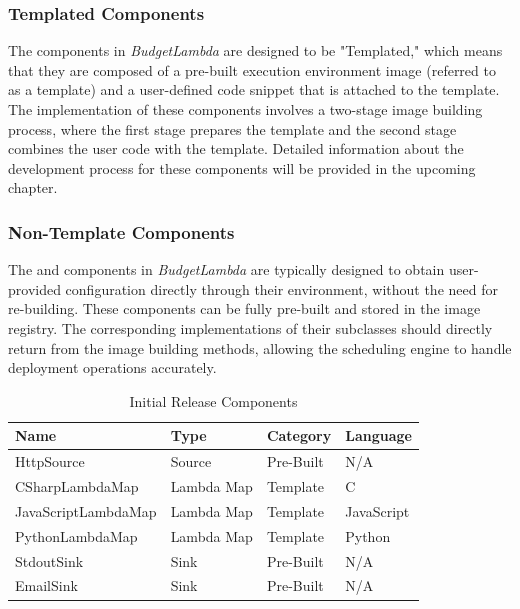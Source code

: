 \documentclass[fleqn,10pt]{SelfArx} %
\newcommand{\CSh}{C\nolinebreak\hspace{-.05em}\raisebox{.6ex}{\scriptsize\bf \#}}
\begin{document}
\subsubsection{Templated Components}

The  components in \emph{BudgetLambda} are designed to be "Templated," which means that they are composed of a pre-built execution environment image (referred to as a template) and a user-defined code snippet that is attached to the template. The implementation of these components involves a two-stage image building process, where the first stage prepares the template and the second stage combines the user code with the template. Detailed information about the development process for these components will be provided in the upcoming chapter.

\subsubsection{Non-Template Components}

The  and  components in \emph{BudgetLambda} are typically designed to obtain user-provided configuration directly through their environment, without the need for re-building. These components can be fully pre-built and stored in the image registry. The corresponding implementations of their  subclasses should directly return from the image building methods, allowing the scheduling engine to handle deployment operations accurately.


\begin{table}[hbt]
	\caption{Initial Release Components}
	\centering
	\begin{tabular}{llll}
		\toprule
		Name & Type & Category & Language \\
		\midrule
		HttpSource & Source & Pre-Built & N/A \\
		CSharpLambdaMap & Lambda Map & Template & \CSh \\
		JavaScriptLambdaMap & Lambda Map & Template & JavaScript \\
		PythonLambdaMap & Lambda Map & Template & Python \\
		StdoutSink & Sink & Pre-Built & N/A \\
		EmailSink & Sink & Pre-Built & N/A \\
		\bottomrule
	\end{tabular}
\end{table}
\end{document}
